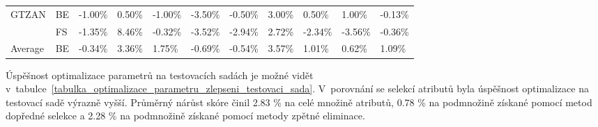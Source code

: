 \begin{table}[H]
{\begin{tabular}{lllllllllll}
    \multirow{-2}{*}{GTZAN}   & \multicolumn{1}{l|}{\cellcolor[HTML]{EFEFEF}BE} & \cellcolor[HTML]{EFEFEF}-1.00\% & \cellcolor[HTML]{EFEFEF}0.50\% & \cellcolor[HTML]{EFEFEF}-1.00\% & \cellcolor[HTML]{EFEFEF}-3.50\% & \cellcolor[HTML]{EFEFEF}-0.50\% & \cellcolor[HTML]{EFEFEF}3.00\% & \cellcolor[HTML]{EFEFEF}0.50\% & \cellcolor[HTML]{EFEFEF}1.00\% & \cellcolor[HTML]{EFEFEF}-0.13\% \\ \cline{1-2}
                              & \multicolumn{1}{l|}{FS}                         & -1.35\%                         & 8.46\%                         & -0.32\%                         & -3.52\%                         & -2.94\%                         & 2.72\%                         & -2.34\%                        & -3.56\%                        & -0.36\%                         \\
    \multirow{-2}{*}{Average} & \multicolumn{1}{l|}{\cellcolor[HTML]{EFEFEF}BE} & \cellcolor[HTML]{EFEFEF}-0.34\% & \cellcolor[HTML]{EFEFEF}3.36\% & \cellcolor[HTML]{EFEFEF}1.75\%  & \cellcolor[HTML]{EFEFEF}-0.69\% & \cellcolor[HTML]{EFEFEF}-0.54\% & \cellcolor[HTML]{EFEFEF}3.57\% & \cellcolor[HTML]{EFEFEF}1.01\% & \cellcolor[HTML]{EFEFEF}0.62\% & \cellcolor[HTML]{EFEFEF}1.09\% 
    \end{tabular}}
\end{table}

Úspěšnost optimalizace parametrů na testovacích sadách je možné vidět v~tabulce~\ref{tabulka_optimalizace_parametru_zlepseni_testovaci_sada}. V~porovnání se selekcí atributů byla úspěšnost optimalizace na testovací sadě výrazně vyšší. Průměrný nárůst skóre činil 2.83 \% na celé množině atributů, 0.78 \% na podmnožině získané pomocí metod dopředné selekce a 2.28 \% na podmnožině získané pomocí metody zpětné eliminace. 

